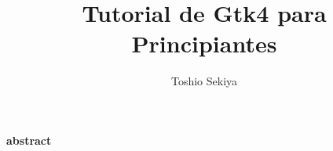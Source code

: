 \documentclass[a4paper]{article}
\title{Tutorial de Gtk4 para Principiantes}
\author{Toshio Sekiya}
\date{}
\begin{document}
\maketitle
\begin{center}
\textbf{abstract}
\end{center}

\newpage
\tableofcontents
\newpage
  
  
  
  
  
  
  
  
  
  
  
  
  
  
  
  
  
  
  
  
  
  
  
  
  
  
  
  
  
\newpage
\appendix
  
  
  
\end{document}
